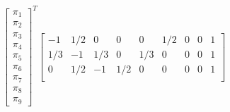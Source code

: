 \begin{equation*}
\begin{bmatrix}
  \pi_1 \\  \pi_2 \\  \pi_3 \\  \pi_4 \\  \pi_5 \\  \pi_6 \\  \pi_7 \\  \pi_8 \\  \pi_9 
\end{bmatrix}^T
\begin{bmatrix}
          -1 &    1/2       &   0       &   0      &    0  &   1/2        &  0  &        0       &   1 \\
     1/3    &     -1  &  1/3     &    0 &   1/3      &   0&         0        & 0        & 1 \\
          0 &    1/2         & -1   & 1/2       &  0       &  0        & 0        & 0  &       1 \\

\end{bmatrix}
\end{equation*}
